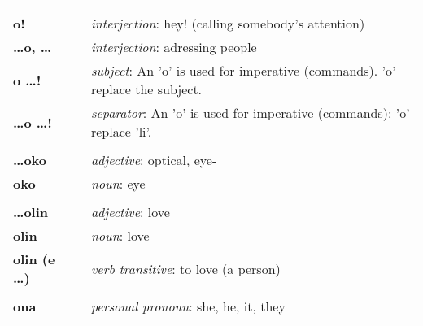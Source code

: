\begin{supertabular}{p{2,5cm}|ll}
                                 &  &                                                                                                            \\
    \textbf{o!}                  &  & \textit{interjection}: hey! (calling somebody's attention)                                                 \\
    \textbf{\dots o, \dots}      &  & \textit{interjection}: adressing people                                                                    \\
    \textbf{o \dots !}           &  & \textit{subject}: An 'o' is used for imperative (commands). 'o' replace the subject.                       \\
    \textbf{\dots o \dots !}     &  & \textit{separator}: An 'o' is used for imperative (commands): 'o' replace 'li'.                            \\
                                 &  &                                                                                                            \\
    \textbf{\dots oko}           &  & \textit{adjective}: optical, eye-                                                                          \\
    \textbf{oko}                 &  & \textit{noun}: eye                                                                                         \\
                                 &  &                                                                                                            \\
    \textbf{\dots olin}          &  & \textit{adjective}: love                                                                                   \\
    \textbf{olin}                &  & \textit{noun}: love                                                                                        \\
    \textbf{olin (e \dots)}      &  & \textit{verb transitive}: to love (a person)                                                               \\
                                 &  &                                                                                                            \\
    \textbf{ona}                 &  & \textit{personal pronoun}: she, he, it, they                                                               \\

\end{supertabular}
